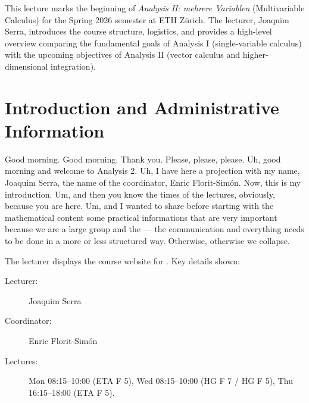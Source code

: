 %

\setcounter{chapter}{8}


\begin{nice-box}[Context]
This lecture marks the beginning of \emph{Analysis II: mehrere Variablen} (Multivariable Calculus) for the Spring 2026 semester at ETH Zürich. The lecturer, Joaquim Serra, introduces the course structure, logistics, and provides a high-level overview comparing the fundamental goals of Analysis I (single-variable calculus) with the upcoming objectives of Analysis II (vector calculus and higher-dimensional integration).
\end{nice-box}

\section*{Introduction and Administrative Information}

\begin{spoken-clean}[00:00:00 - 00:01:20]
Good morning. Good morning. Thank you. Please, please, please. Uh, good morning and welcome to Analysis 2. Uh, I have here a projection with my name, Joaquim Serra, the name of the coordinator, Enric Florit-Simón. Now, this is my introduction. Um, and then you know the times of the lectures, obviously, because you are here. Um, and I wanted to share before starting with the mathematical content some practical informations that are very important because we are a large group and the — the communication and everything needs to be done in a more or less structured way. Otherwise, otherwise we collapse.
\end{spoken-clean}

\begin{meta-note}
The lecturer displays the course website for . Key details shown:
\begin{description}
    \item[Lecturer:] Joaquim Serra
    \item[Coordinator:] Enric Florit-Simón
    \item[Lectures:] Mon 08:15--10:00 (ETA F 5), Wed 08:15--10:00 (HG F 7 / HG F 5), Thu 16:15--18:00 (ETA F 5).
\end{description}
\end{meta-note}

